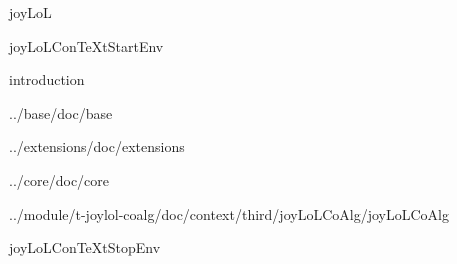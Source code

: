
\usemodule[t-diSimp]

\startDiSimpComponent joyLoL

\diSimpEnvironment joyLoLConTeXtStartEnv

\diSimpComponent introduction

\diSimpComponent ../base/doc/base

\diSimpComponent ../extensions/doc/extensions

\diSimpComponent ../core/doc/core

\diSimpComponent ../module/t-joylol-coalg/doc/context/third/joyLoLCoAlg/joyLoLCoAlg

\diSimpEnvironment joyLoLConTeXtStopEnv

\stopDiSimpComponent
